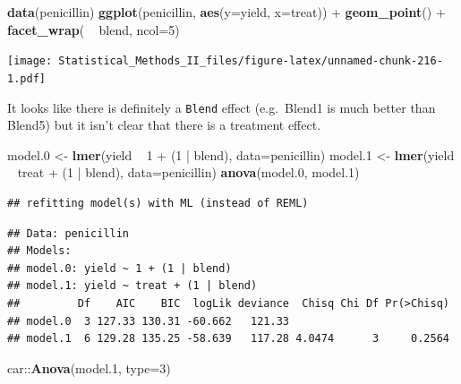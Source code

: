 \documentclass[]{book}
\newenvironment{Shaded}{\begin{snugshade}}{\end{snugshade}}
\newcommand{\KeywordTok}[1]{\textcolor[rgb]{0.13,0.29,0.53}{\textbf{{#1}}}}
\newcommand{\DataTypeTok}[1]{\textcolor[rgb]{0.13,0.29,0.53}{{#1}}}
\newcommand{\DecValTok}[1]{\textcolor[rgb]{0.00,0.00,0.81}{{#1}}}
\newcommand{\FloatTok}[1]{\textcolor[rgb]{0.00,0.00,0.81}{{#1}}}
\newcommand{\StringTok}[1]{\textcolor[rgb]{0.31,0.60,0.02}{{#1}}}
\newcommand{\NormalTok}[1]{{#1}}
\theoremstyle{definition}
\theoremstyle{definition}
\theoremstyle{remark}
\begin{document}
\begin{Shaded}
\begin{Highlighting}[]
\KeywordTok{data}\NormalTok{(penicillin)}
\KeywordTok{ggplot}\NormalTok{(penicillin, }\KeywordTok{aes}\NormalTok{(}\DataTypeTok{y=}\NormalTok{yield, }\DataTypeTok{x=}\NormalTok{treat)) +}
\StringTok{  }\KeywordTok{geom_point}\NormalTok{() +}\StringTok{ }
\StringTok{  }\KeywordTok{facet_wrap}\NormalTok{( ~}\StringTok{ }\NormalTok{blend, }\DataTypeTok{ncol=}\DecValTok{5}\NormalTok{)}
\end{Highlighting}
\end{Shaded}

\texttt{[image: Statistical\_Methods\_II\_files/figure-latex/unnamed-chunk-216-1.pdf]}

It looks like there is definitely a \texttt{Blend} effect (e.g.~Blend1
is much better than Blend5) but it isn't clear that there is a treatment
effect.

\begin{Shaded}
\begin{Highlighting}[]
\NormalTok{model}\FloatTok{.0} \NormalTok{<-}\StringTok{ }\KeywordTok{lmer}\NormalTok{(yield ~}\StringTok{  }\DecValTok{1}    \NormalTok{+}\StringTok{ }\NormalTok{(}\DecValTok{1} \NormalTok{|}\StringTok{ }\NormalTok{blend), }\DataTypeTok{data=}\NormalTok{penicillin)}
\NormalTok{model}\FloatTok{.1} \NormalTok{<-}\StringTok{ }\KeywordTok{lmer}\NormalTok{(yield ~}\StringTok{ }\NormalTok{treat +}\StringTok{ }\NormalTok{(}\DecValTok{1} \NormalTok{|}\StringTok{ }\NormalTok{blend), }\DataTypeTok{data=}\NormalTok{penicillin)}
\KeywordTok{anova}\NormalTok{(model}\FloatTok{.0}\NormalTok{, model}\FloatTok{.1}\NormalTok{)}
\end{Highlighting}
\end{Shaded}

\begin{verbatim}
## refitting model(s) with ML (instead of REML)
\end{verbatim}

\begin{verbatim}
## Data: penicillin
## Models:
## model.0: yield ~ 1 + (1 | blend)
## model.1: yield ~ treat + (1 | blend)
##         Df    AIC    BIC  logLik deviance  Chisq Chi Df Pr(>Chisq)
## model.0  3 127.33 130.31 -60.662   121.33                         
## model.1  6 129.28 135.25 -58.639   117.28 4.0474      3     0.2564
\end{verbatim}

\begin{Shaded}
\begin{Highlighting}[]
\NormalTok{car::}\KeywordTok{Anova}\NormalTok{(model}\FloatTok{.1}\NormalTok{, }\DataTypeTok{type=}\DecValTok{3}\NormalTok{)}
\end{Highlighting}
\end{Shaded}
\end{document}
